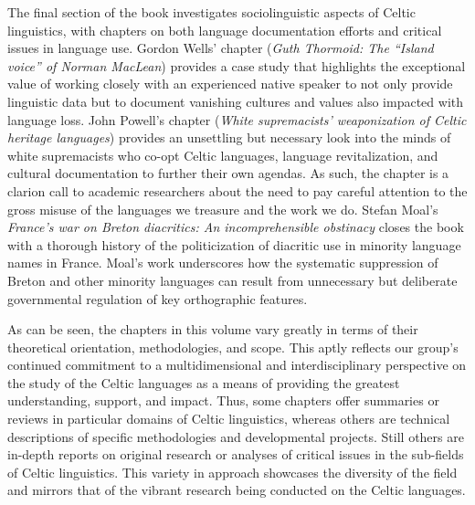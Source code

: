 \documentclass[output=paper]{langsci/langscibook}
\begin{document}
The final section of the book investigates sociolinguistic aspects of Celtic linguistics, with chapters on both language documentation efforts and critical issues in language use. Gordon Wells' chapter (\textit{Guth Thormoid: The “Island voice” of Norman MacLean}) provides a case study that highlights the exceptional value of working closely with an experienced native speaker to not only provide linguistic data but to document vanishing cultures and values also impacted with language loss. John Powell’s chapter (\textit{White supremacists’ weaponization of Celtic heritage languages}) provides an unsettling but necessary look into the minds of white supremacists who co-opt Celtic languages, language revitalization, and cultural documentation to further their own agendas. As such, the chapter is a clarion call to academic researchers about the need to pay careful attention to the gross misuse of the languages we treasure and the work we do. Stefan Moal’s \textit{France’s war on Breton diacritics: An incomprehensible obstinacy} closes the book with a thorough history of the politicization of diacritic use in minority language names in France. Moal's work underscores how the systematic suppression of Breton and other minority languages can result from unnecessary but deliberate governmental regulation of key orthographic features. 

As can be seen, the chapters in this volume vary greatly in terms of their theoretical orientation, methodologies, and scope. This aptly reflects our group's continued commitment to a multidimensional and interdisciplinary perspective on the study of the Celtic languages as a means of providing the greatest understanding, support, and impact. Thus, some chapters offer summaries or reviews in particular domains of Celtic linguistics, whereas others are technical descriptions of specific methodologies and developmental projects. Still others are in-depth reports on original research or analyses of critical issues in the sub-fields of Celtic linguistics. This variety in approach showcases the diversity of the field and mirrors that of the vibrant research being conducted on the Celtic languages.

\cleardoublepage
\end{document}
